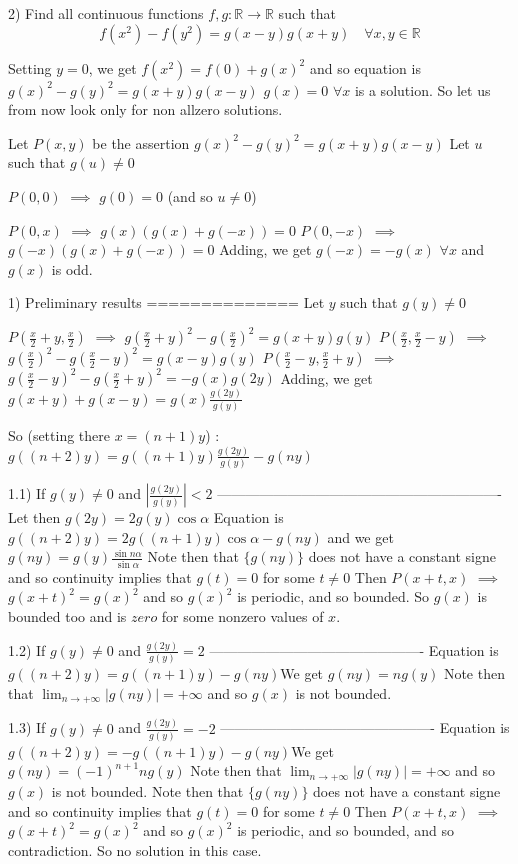 \begin{solution}
	\begin{tcolorbox}2) Find all continuous functions $f,g:\mathbb{R}\to\mathbb{R}$ such that 
\[f(x^2)-f(y^2)=g(x-y)g(x+y) \quad \forall x,y\in\mathbb{R}\]\end{tcolorbox}
Setting $y=0$, we get $f(x^2)=f(0)+g(x)^2$ and so equation is $g(x)^2-g(y)^2=g(x+y)g(x-y)$
$g(x)=0$ $\forall x$ is a solution. So let us from now look only for non allzero solutions.

Let $P(x,y)$ be the assertion $g(x)^2-g(y)^2=g(x+y)g(x-y)$
Let $u$ such that $g(u)\ne 0$

$P(0,0)$ $\implies$ $g(0)=0$ (and so $u\ne 0$)

$P(0,x)$ $\implies$  $g(x)(g(x)+g(-x))=0$
$P(0,-x)$ $\implies$  $g(-x)(g(x)+g(-x))=0$
Adding, we get $g(-x)=-g(x)$ $\forall x$ and $g(x)$ is odd.

1) Preliminary results
==============
Let $y$ such that $g(y)\ne 0$

$P(\frac x2+y,\frac x2)$ $\implies$ $g(\frac x2+y)^2-g(\frac x2)^2=g(x+y)g(y)$
$P(\frac x2,\frac x2-y)$ $\implies$ $g(\frac x2)^2-g(\frac x2-y)^2=g(x-y)g(y)$
$P(\frac x2-y,\frac x2+y)$ $\implies$ $g(\frac x2-y)^2-g(\frac x2+y)^2=-g(x)g(2y)$
Adding, we get  $g(x+y)+g(x-y)=g(x)\frac{g(2y)}{g(y)}$

So (setting there $x=(n+1)y$) : $g((n+2)y)=g((n+1)y)\frac{g(2y)}{g(y)}-g(ny)$

1.1) If $g(y)\ne 0$ and $\left|\frac{g(2y)}{g(y)}\right|< 2$
-------------------------------------------------------------
Let then $g(2y)=2g(y)\cos\alpha$
Equation is $g((n+2)y)=2g((n+1)y)\cos \alpha-g(ny)$  and we get $g(ny)=g(y)\frac{\sin n\alpha}{\sin \alpha}$
Note then that $\{g(ny)\}$ does not have a constant signe and so continuity implies that $g(t)=0$ for some $t\ne 0$
Then $P(x+t,x)$ $\implies$ $g(x+t)^2=g(x)^2$ and so $g(x)^2$ is periodic, and so bounded. 
So $g(x)$ is bounded too and is $zero$ for some nonzero values of $x$.

1.2) If $g(y)\ne 0$ and $\frac{g(2y)}{g(y)}= 2$
----------------------------------------------
Equation is $g((n+2)y)=g((n+1)y)-g(ny)$We get $g(ny)=ng(y)$
Note then that $\lim_{n\to+\infty}|g(ny)|=+\infty$ and so $g(x)$ is not bounded.

1.3) If $g(y)\ne 0$ and $\frac{g(2y)}{g(y)}= -2$
----------------------------------------------
Equation is $g((n+2)y)=-g((n+1)y)-g(ny)$We get $g(ny)=(-1)^{n+1}ng(y)$
Note then that $\lim_{n\to+\infty}|g(ny)|=+\infty$ and so $g(x)$ is not bounded.
Note then that $\{g(ny)\}$ does not have a constant signe and so continuity implies that $g(t)=0$ for some $t\ne 0$
Then $P(x+t,x)$ $\implies$ $g(x+t)^2=g(x)^2$ and so $g(x)^2$ is periodic, and so bounded, and so contradiction.
So no solution in this case.


\end{solution}
